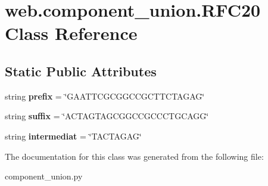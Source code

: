 \hypertarget{classweb_1_1component__union_1_1_r_f_c20}{\section{web.\-component\-\_\-union.\-R\-F\-C20 Class Reference}
\label{classweb_1_1component__union_1_1_r_f_c20}
}
\subsection*{Static Public Attributes}
\begin{DoxyCompactItemize}
\item 
\hypertarget{classweb_1_1component__union_1_1_r_f_c20_ab205c2c6376fb4675b10f603414a0231}{string {\bfseries prefix} = \char`\"{}G\-A\-A\-T\-T\-C\-G\-C\-G\-G\-C\-C\-G\-C\-T\-T\-C\-T\-A\-G\-A\-G\char`\"{}}\label{classweb_1_1component__union_1_1_r_f_c20_ab205c2c6376fb4675b10f603414a0231}

\item 
\hypertarget{classweb_1_1component__union_1_1_r_f_c20_a55fba88b8140182ab2640398452cd379}{string {\bfseries suffix} = \char`\"{}A\-C\-T\-A\-G\-T\-A\-G\-C\-G\-G\-C\-C\-G\-C\-C\-C\-T\-G\-C\-A\-G\-G\char`\"{}}\label{classweb_1_1component__union_1_1_r_f_c20_a55fba88b8140182ab2640398452cd379}

\item 
\hypertarget{classweb_1_1component__union_1_1_r_f_c20_ae0900321fd9f180c245efe9f05628326}{string {\bfseries intermediat} = \char`\"{}T\-A\-C\-T\-A\-G\-A\-G\char`\"{}}\label{classweb_1_1component__union_1_1_r_f_c20_ae0900321fd9f180c245efe9f05628326}

\end{DoxyCompactItemize}


The documentation for this class was generated from the following file\-:\begin{DoxyCompactItemize}
\item 
component\-\_\-union.\-py\end{DoxyCompactItemize}
